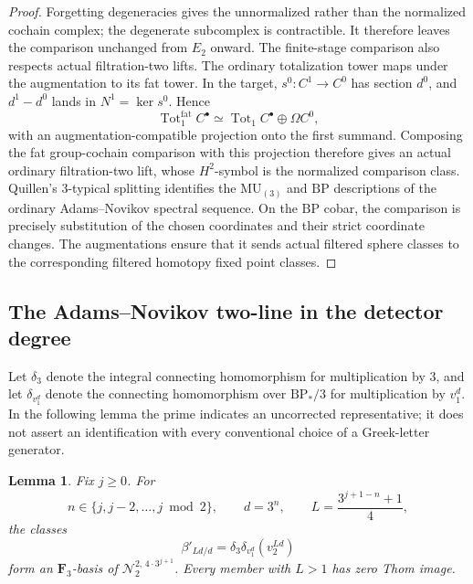 \documentclass[11pt]{article}
\newtheorem{lemma}[theorem]{Lemma}
\theoremstyle{definition}
\theoremstyle{remark}
\numberwithin{equation}{section}
\begin{document}
\begin{proof}
Forgetting degeneracies gives the unnormalized rather than the
normalized cochain complex; the degenerate subcomplex is
contractible.  It therefore leaves the comparison unchanged from
\(E_2\) onward.  The finite-stage comparison also respects actual
filtration-two lifts.  The ordinary totalization tower maps under
the augmentation to its fat tower.  In the target,
\(s^0:C^1\to C^0\) has section \(d^0\), and \(d^1-d^0\)
lands in \(N^1=\ker s^0\).  Hence
\[
 \operatorname{Tot}^{\mathrm{fat}}_1 C^\bullet
 \simeq \operatorname{Tot}_1 C^\bullet\oplus\Omega C^0,
\]
with an augmentation-compatible projection onto the first summand.
Composing the fat group-cochain comparison with this projection
therefore gives an actual ordinary filtration-two lift, whose
\(H^2\)-symbol is the normalized comparison class.
Quillen's \(3\)-typical splitting
\cite[Theorems~4--5]{Quillen} identifies the
\(\mathrm{MU}_{(3)}\) and \(\mathrm{BP}\) descriptions of the ordinary
Adams--Novikov spectral sequence.
On the \(\mathrm{BP}\) cobar, the comparison is precisely substitution of
the chosen coordinates and their strict coordinate changes.
The augmentations ensure that it sends actual filtered sphere
classes to the corresponding filtered homotopy fixed point classes.
\end{proof}

\subsection{The Adams--Novikov two-line in the detector degree}

Let \(\delta_3\) denote the integral connecting homomorphism for
multiplication by \(3\), and let \(\delta_{v_1^d}\) denote the
connecting homomorphism over \(\mathrm{BP}_*/3\) for multiplication by
\(v_1^d\).  In the following lemma the prime indicates an
uncorrected representative; it does not assert an identification
with every conventional choice of a Greek-letter generator.

\begin{lemma}\label{det:two-line-basis}
Fix \(j\geq0\).  For
\[
 n\in\{j,j-2,\ldots,j\bmod2\},\qquad
 d=3^n,\qquad L=\frac{3^{j+1-n}+1}{4},
\]
the classes
\begin{equation}\label{det:uncorrected-beta}
 \beta'_{Ld/d}=\delta_3\delta_{v_1^d}(v_2^{Ld})
\end{equation}
form an \(\mathbf F_3\)-basis of
\(\mathcal N_2^{2,\,4\cdot3^{j+1}}\).
Every member with \(L>1\) has zero Thom image.
\end{lemma}
\end{document}
